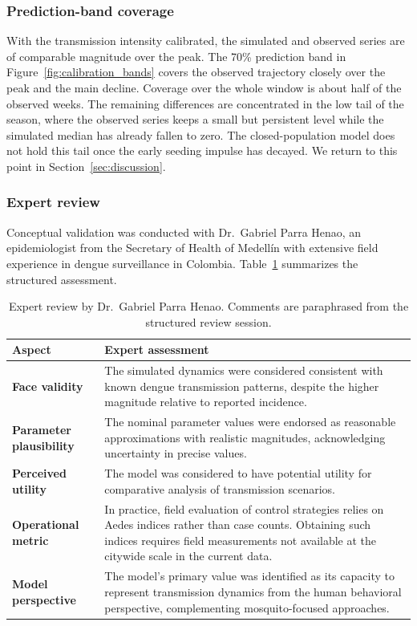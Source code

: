 \documentclass[applsci,article,accept,pdftex,moreauthors]{Definitions/mdpi}
\begin{document}
\subsubsection{Prediction-band coverage}

With the transmission intensity calibrated, the simulated and observed series are of comparable magnitude over the peak. The 70\% prediction band in Figure~\ref{fig:calibration_bands} covers the observed trajectory closely over the peak and the main decline. Coverage over the whole window is about half of the observed weeks. The remaining differences are concentrated in the low tail of the season, where the observed series keeps a small but persistent level while the simulated median has already fallen to zero. The closed-population model does not hold this tail once the early seeding impulse has decayed. We return to this point in Section~\ref{sec:discussion}.

\subsubsection{Expert review}

Conceptual validation was conducted with Dr.~Gabriel Parra Henao, an epidemiologist from the Secretary of Health of Medellín with extensive field experience in dengue surveillance in Colombia. Table~\ref{table:expert_review} summarizes the structured assessment.

\begin{table}[H]
\centering
\caption{Expert review by Dr.~Gabriel Parra Henao. Comments are paraphrased from the structured review session.}
\label{table:expert_review}
\begin{tabularx}{\textwidth}{>{\bfseries}p{3.5cm} X}
\toprule
Aspect & Expert assessment \\
\midrule
Face validity & The simulated dynamics were considered consistent with known dengue transmission patterns, despite the higher magnitude relative to reported incidence. \\
Parameter plausibility & The nominal parameter values were endorsed as reasonable approximations with realistic magnitudes, acknowledging uncertainty in precise values. \\
Perceived utility & The model was considered to have potential utility for comparative analysis of transmission scenarios. \\
Operational metric & In practice, field evaluation of control strategies relies on Aedes indices rather than case counts. Obtaining such indices requires field measurements not available at the citywide scale in the current data. \\
Model perspective & The model's primary value was identified as its capacity to represent transmission dynamics from the human behavioral perspective, complementing mosquito-focused approaches. \\
\bottomrule
\end{tabularx}
\end{table}
\end{document}
